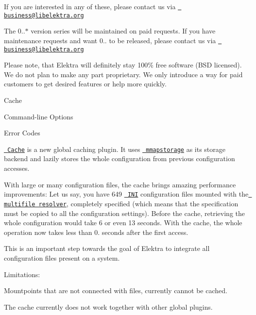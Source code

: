 If you are interested in any of these, please contact us via \href{mailto:business@libelektra.org}{\texttt{ business@libelektra.\+org}}

The 0..$\ast$ version series will be maintained on paid requests. If you have maintenance requests and want 0.. to be released, please contact us via \href{mailto:business@libelektra.org}{\texttt{ business@libelektra.\+org}}

Please note, that Elektra will definitely stay 100\% free software (B\+SD licensed). We do not plan to make any part proprietary. We only introduce a way for paid customers to get desired features or help more quickly.


\begin{DoxyItemize}
\item Cache
\item Command-\/line Options
\item Error Codes
\end{DoxyItemize}

\href{https://www.libelektra.org/plugins/cache}{\texttt{ Cache}} is a new global caching plugin. It uses \href{https://www.libelektra.org/plugins/mmapstorage}{\texttt{ mmapstorage}} as its storage backend and lazily stores the whole configuration from previous configuration accesses.

With large or many configuration files, the cache brings amazing performance improvements\+: Let us say, you have 649 \href{https://www.libelektra.org/plugins/ini}{\texttt{ I\+NI}} configuration files mounted with the \href{https://www.libelektra.org/plugins/multifile}{\texttt{ multifile resolver}}, completely specified (which means that the specification must be copied to all the configuration settings). Before the cache, retrieving the whole configuration would take 6 or even 13 seconds. With the cache, the whole operation now takes less than 0. seconds after the first access.

This is an important step towards the goal of Elektra to integrate all configuration files present on a system.

Limitations\+:


\begin{DoxyItemize}
\item Mountpoints that are not connected with files, currently cannot be cached.
\item The cache currently does not work together with other global plugins.
\end{DoxyItemize}

